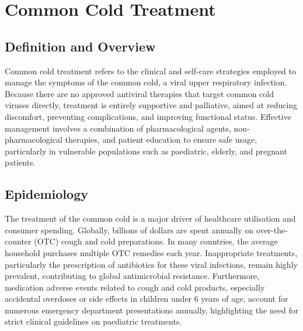 \chapter{Common Cold Treatment}

\section*{Definition and Overview}
Common cold treatment refers to the clinical and self-care strategies employed to manage the symptoms of the common cold, a viral upper respiratory infection. Because there are no approved antiviral therapies that target common cold viruses directly, treatment is entirely supportive and palliative, aimed at reducing discomfort, preventing complications, and improving functional status. Effective management involves a combination of pharmacological agents, non-pharmacological therapies, and patient education to ensure safe usage, particularly in vulnerable populations such as paediatric, elderly, and pregnant patients.

\section*{Epidemiology}
The treatment of the common cold is a major driver of healthcare utilisation and consumer spending. Globally, billions of dollars are spent annually on over-the-counter (OTC) cough and cold preparations. In many countries, the average household purchases multiple OTC remedies each year. Inappropriate treatments, particularly the prescription of antibiotics for these viral infections, remain highly prevalent, contributing to global antimicrobial resistance. Furthermore, medication adverse events related to cough and cold products, especially accidental overdoses or side effects in children under 6 years of age, account for numerous emergency department presentations annually, highlighting the need for strict clinical guidelines on paediatric treatments.

